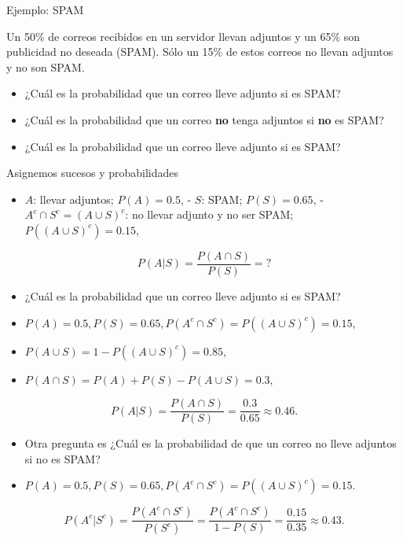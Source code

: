 \documentclass[
  letterpaper,
  DIV=11,
  numbers=noendperiod]{scrreprt}
\providecommand{\tightlist}{%
  \setlength{\itemsep}{0pt}\setlength{\parskip}{0pt}}\usepackage{longtable,booktabs,array}
\begin{document}
\begin{Ejemplo}{Ejemplo: SPAM}{}

Un 50\% de correos recibidos en un servidor llevan adjuntos y un 65\%
son publicidad no deseada (SPAM). Sólo un 15\% de estos correos no
llevan adjuntos y no son SPAM.

\begin{itemize}
\tightlist
\item
  ¿Cuál es la probabilidad que un correo lleve adjunto si es SPAM?
\item
  ¿Cuál es la probabilidad que un correo \textbf{no} tenga adjuntos si
  \textbf{no} es SPAM?
\item
  ¿Cuál es la probabilidad que un correo lleve adjunto si es SPAM?
\end{itemize}

Asignemos sucesos y probabilidades

\begin{itemize}
\tightlist
\item
  \(A\): llevar adjuntos; \(P(A)=0.5\), - \(S\): SPAM; \(P(S)=0.65\), -
  \(A^c\cap S^c=(A\cup S)^c\): no llevar adjunto y no ser SPAM;
  \(P((A\cup S)^c)=0.15\),
\end{itemize}

\[P(A|S)=\dfrac{P(A\cap S)}{P(S)}=?\]

\begin{itemize}
\item
  ¿Cuál es la probabilidad que un correo lleve adjunto si es SPAM?
\item
  \(P(A)=0.5, P(S)=0.65, P(A^c\cap S^c)=P((A\cup S)^c)=0.15\),
\item
  \(P(A\cup S)=1-P((A\cup S)^c)=0.85\),
\item
  \(P(A\cap S)=P(A)+P(S)-P(A\cup S)=0.3\),
\end{itemize}

\[P(A|S)=\dfrac{P(A\cap S)}{P(S)}=\dfrac{0.3}{0.65}\approx 0.46.\]

\begin{itemize}
\item
  Otra pregunta es ¿Cuál es la probabilidad de que un correo no lleve
  adjuntos si no es SPAM?
\item
  \(P(A)=0.5, P(S)=0.65, P(A^c\cap S^c)=P((A\cup S)^c)=0.15.\)
\end{itemize}

\[P(A^c|S^c)=\dfrac{P(A^c\cap S^c)}{P(S^c)}=\dfrac{P(A^c\cap S^c)}{1-P(S)}=\dfrac{0.15}{0.35}\approx 0.43.\]

\end{Ejemplo}
\end{document}
